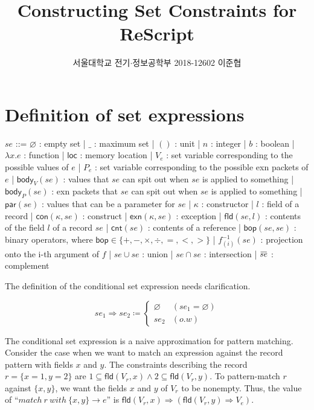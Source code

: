 \documentclass{article}
\title{Constructing Set Constraints for ReScript}
\author{서울대학교 전기$\cdot$정보공학부 2018-12602 이준협}
\date{}
\newcommand{\loverbar}[1]{\mkern 1.5mu\overline{\mkern-1.5mu#1\mkern-1.5mu}\mkern 1.5mu}
\begin{document}
\maketitle
\section{Definition of set expressions}
\begin{bnfgrammar}
  $se$ ::= $\varnothing$ : empty set
  | $\_$ : maximum set
  | $()$ : unit
  | $n$ : integer
  | $b$ : boolean
  | $\lambda x.e$ : function
  | $\mathsf{loc}$ : memory location
  | $V_{e}$ : set variable corresponding to the possible values of $e$
  | $P_{e}$ : set variable corresponding to the possible exn packets of $e$
  | $\mathsf{body}_{V}(se)$ : values that $se$ can spit out when $se$ is applied to something
  | $\mathsf{body}_{P}(se)$ : exn packets that $se$ can spit out when $se$ is applied to something
  | $\mathsf{par}(se)$ : values that can be a parameter for $se$
  | $\kappa$ : constructor
  | $l$ : field of a record
  | $\mathsf{con}(\kappa,se)$ : construct
  | $\mathsf{exn}(\kappa,se)$ : exception
  | $\mathsf{fld}(se, l)$ : contents of the field $l$ of a record $se$
  | $\mathsf{cnt}(se)$ : contents of a reference
  | $\mathsf{bop}(se, se)$ : binary operators, where $\mathsf{bop}\in\{+, -, \times, \div, =, <, >\}$
  | $f^{-1}_{(i)}(se)$ : projection onto the i-th argument of $f$
  | $se \cup se$ : union
  | $se \cap se$ : intersection
  | $\loverbar{se}$ : complement
\end{bnfgrammar}

The definition of the conditional set expression needs clarification.

\[
  se_{1} \Rightarrow se_{2} \coloneq
  \begin{cases}
    \varnothing & (se_{1}=\varnothing)\\
    se_{2} & (o.w)
  \end{cases}
\]

The conditional set expression is a naive approximation for pattern matching. Consider the case when we want to match an expression against the record pattern with fields $x$ and $y$.
The constraints describing the record $r = \{x = 1, y = 2\}$ are $1 \subseteq \mathsf{fld}(V_{r}, x) \wedge 2 \subseteq \mathsf{fld}(V_{r}, y)$.
To pattern-match $r$ against $\{x, y\}$, we want the fields $x$ and $y$ of $V_{r}$ to be nonempty.
Thus, the value of ``$match\:r\:with\:\{x, y\}\rightarrow e$'' is $\mathsf{fld}(V_{r}, x)\Rightarrow(\mathsf{fld}(V_{r},y)\Rightarrow V_{e})$.
\end{document}
